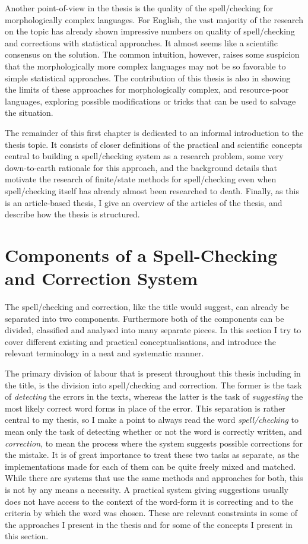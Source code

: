 \documentclass[officiallayout]{unihelcompling}
\begin{document}
Another point-of-view in the thesis is the quality of the spell\-/checking for
morphologically complex languages. For English, the vast majority of the
research on the topic has already shown impressive numbers on quality of
spell\-/checking and corrections with statistical approaches. It almost seems
like a scientific consensus on the solution. The common intuition,
however, raises some suspicion that the morphologically more complex languages
may not be so favorable to simple statistical approaches. The contribution of
this thesis is also in showing the limits of these approaches for
morphologically complex, and resource-poor languages, exploring possible
modifications or tricks that can be used to salvage the situation.

The remainder of this first chapter is dedicated to an informal introduction to
the thesis topic. It consists of closer definitions of the practical and
scientific concepts central to building a spell\-/checking system as a research
problem, some very down-to-earth rationale for this approach, and the
background details that motivate the research of finite\-/state methods for
spell\-/checking even when spell\-/checking itself has already almost been
researched to death. Finally, as this is an article-based thesis, I give an
overview of the articles of the thesis, and describe how the thesis is
structured.

\section{Components of a Spell-Checking and Correction System}
\label{sec:practical-components}

The spell\-/checking and correction, like the title would suggest, can already be
separated into two components. Furthermore both of the components can be
divided, classified and analysed into many separate pieces. In this section I
try to cover different existing and practical conceptualisations, and introduce
the relevant terminology in a neat and systematic manner.

The primary division of labour that is present throughout this thesis including
in the title, is the division into spell\-/checking and correction. The former is
the task of \emph{detecting} the errors in the texts, whereas the latter is the
task of \emph{suggesting} the most likely correct word forms in place of the
error. This separation is rather central to my thesis, so I make a point to
always read the word \emph{spell\-/checking} to mean only the task of detecting
whether or not the word is correctly written, and \emph{correction}, to mean
the process where the system suggests possible corrections for the mistake.  It
is of great importance to treat these two tasks as separate, as the
implementations made for each of them can be quite freely mixed and matched.
While there are systems that use the same methods and approaches for both, this
is not by any means a necessity. A practical system giving suggestions usually
does not have access to the context of the word-form it is correcting and to
the criteria by which the word was chosen. These are relevant constraints in
some of the approaches I present in the thesis and for some of the concepts I
present in this section.
\end{document}
